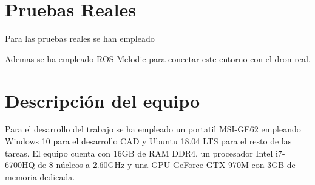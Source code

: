 
\section{Pruebas Reales}

Para las pruebas reales se han empleado

Ademas se ha empleado ROS Melodic para conectar este entorno con el dron real.

\section{Descripción del equipo}
Para el desarrollo del trabajo se ha empleado un portatil MSI-GE62 empleando Windows 10 para el desarrollo CAD y Ubuntu 18.04 LTS para el resto de las tareas. El equipo cuenta con 16GB de RAM DDR4, un procesador Intel i7-6700HQ de 8 núcleos a 2.60GHz y una GPU GeForce GTX 970M con 3GB de memoria dedicada.

